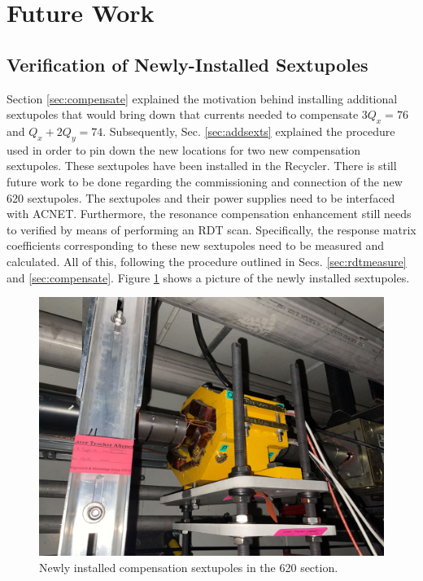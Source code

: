 \section{Future Work}

\subsection{Verification of Newly-Installed Sextupoles}

Section \ref{sec:compensate} explained the motivation behind installing additional sextupoles that would bring down that currents needed to compensate $3Q_x=76$ and $Q_x+ 2Q_y = 74$. Subsequently, Sec. \ref{sec:addsexts} explained the procedure used in order to pin down the new locations for two new compensation sextupoles. These sextupoles have been installed in the Recycler. There is still future work to be done regarding the commissioning and connection of the new 620 sextupoles. The sextupoles and their power supplies need to be interfaced with ACNET. Furthermore, the resonance compensation enhancement still needs to verified by means of performing an RDT scan. Specifically, the response matrix coefficients corresponding to these new sextupoles need to be measured and calculated. All of this, following the procedure outlined in Secs. \ref{sec:rdtmeasure} and \ref{sec:compensate}. Figure \ref{fig:new620sexts} shows a picture of the newly installed sextupoles.

\begin{figure}[H]
    \centering
    \includegraphics[width=\columnwidth]{chapter7/620_sext.jpg}
    \caption{Newly installed compensation sextupoles in the 620 section.}
    \label{fig:new620sexts}
\end{figure}

